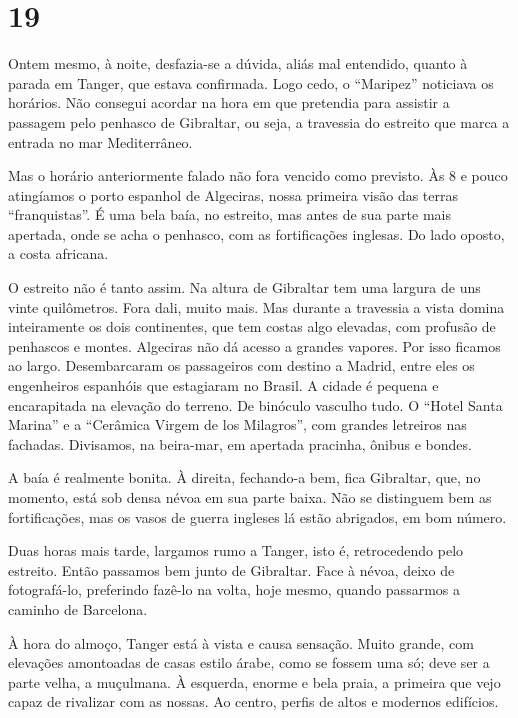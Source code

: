 \section*{19 \adfflatleafright {}}

Ontem mesmo, à noite, desfazia-se a dúvida, aliás mal entendido, quanto à parada em Tanger, que estava confirmada. Logo cedo, o ``Maripez'' noticiava os horários. Não consegui acordar na hora em que pretendia para assistir a passagem pelo penhasco de Gibraltar, ou seja, a travessia do estreito que marca a entrada no mar Mediterrâneo.

Mas o horário anteriormente falado não fora vencido como previsto. Às 8 e pouco atingíamos o porto espanhol de Algeciras, nossa primeira visão das terras ``franquistas''. É uma bela baía, no estreito, mas antes de sua parte mais apertada, onde se acha o penhasco, com as fortificações inglesas. Do lado oposto, a costa africana.

O estreito não é tanto assim. Na altura de Gibraltar tem uma largura de uns vinte quilômetros. Fora dali, muito mais. Mas durante a travessia a vista domina inteiramente os dois continentes, que tem costas algo elevadas, com profusão de penhascos e montes. Algeciras não dá acesso a grandes vapores. Por isso ficamos ao largo. Desembarcaram os passageiros com destino a Madrid, entre eles os engenheiros espanhóis que estagiaram no Brasil. A cidade é pequena e encarapitada na elevação do terreno. De binóculo vasculho tudo. O ``Hotel Santa Marina'' e a ``Cerâmica Virgem de los Milagros'', com grandes letreiros nas fachadas. Divisamos, na beira-mar, em apertada pracinha, ônibus e bondes.

A baía é realmente bonita. À direita, fechando-a bem, fica Gibraltar, que, no momento, está sob densa névoa em sua parte baixa. Não se distinguem bem as fortificações, mas os vasos de guerra ingleses lá estão abrigados, em bom número.

Duas horas mais tarde, largamos rumo a Tanger, isto é, retrocedendo pelo estreito. Então passamos bem junto de Gibraltar. Face à névoa, deixo de fotografá-lo, preferindo fazê-lo na volta, hoje mesmo, quando passarmos a caminho de Barcelona.

À hora do almoço, Tanger está à vista e causa sensação. Muito grande, com elevações amontoadas de casas estilo árabe, como se fossem uma só; deve ser a parte velha, a muçulmana. À esquerda, enorme e bela praia, a primeira que vejo capaz de rivalizar com as nossas. Ao centro, perfis de altos e modernos edifícios.

